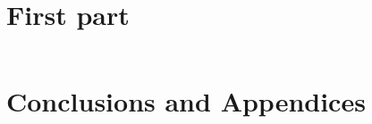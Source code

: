 \documentclass[a4paper,10pt,fleqn,openright]{Quark}
\begin{document}
\makeatletter
\renewcommand{\@makechapterhead}[1]{%
  \chapterheadstartvskip%
  {\size@chapter{\sectfont
    {  \begin{adjustwidth}{0pt}{-\marginBiblio}
     {\raggedleft\chapnumfont
      \ifnum \c@secnumdepth >\m@ne%
        \if@mainmatter\thechapter\else\phantom{\thechapter}%
      \fi\else\phantom{\thechapter}\fi
      \par\nobreak}%
      \end{adjustwidth}
      }
    { \begin{adjustwidth}{0pt}{-\marginBiblio}
    {\raggedleft\advance\leftmargin10em\interlinepenalty\@M #1\par}
    \end{adjustwidth} }}
  \nobreak\chapterheadendvskip}
  }%
\makeatother

\part{First part}	
\newpage
$~$
\newpage






\part{Conclusions and  Appendices}

\newpage
$~$
\newpage






\appendix






\renewcommand{\chapterheadstartvskip}{\vspace*{-6.33cm}}

\makeatletter
\renewcommand{\@makechapterhead}[1]{%
  \chapterheadstartvskip%
  {\size@chapter{\sectfont
    {  
     {\raggedleft\chapnumfont
      \ifnum \c@secnumdepth >\m@ne%
        \if@mainmatter\thechapter\else\phantom{\thechapter}%
      \fi\else\phantom{\thechapter}\fi
      \par\nobreak}%
      
      }
    { 
    {\raggedleft\advance\leftmargin10em\interlinepenalty\@M #1\par}
     }}
  \nobreak\chapterheadendvskip}
  }%
\makeatother
\end{document}
